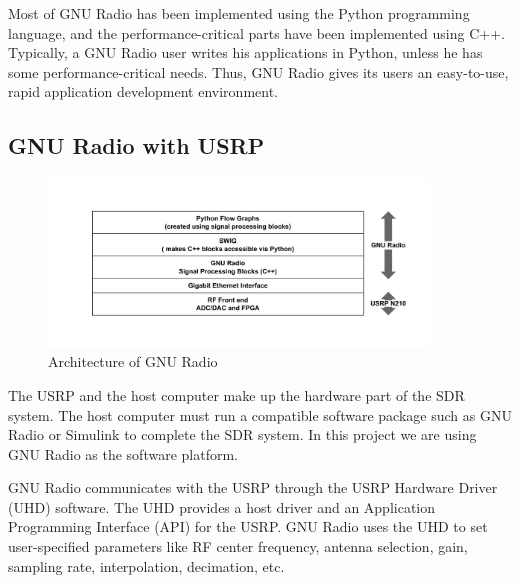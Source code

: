 Most of GNU Radio has been implemented using the Python programming language,
and the performance-critical parts have been implemented using C++. Typically,
a GNU Radio user writes his applications in Python, unless he has some
performance-critical needs. Thus, GNU Radio gives its users an easy-to-use,
rapid application development environment.

\subsection{GNU Radio with USRP}

\begin{figure}
\centering
\includegraphics[width=0.9\textwidth]{gnuradio_architecture}
\caption{Architecture of GNU Radio}
\label{gnuradio_architecture}
\end{figure}

The USRP and the host computer make up the hardware part of the SDR system. 
The host computer must run a compatible software package such as GNU Radio or
Simulink to complete the SDR system. In this project we are using GNU Radio
as the software platform.

GNU Radio communicates with the USRP through the USRP Hardware Driver (UHD)
software. The UHD provides a host driver and an Application Programming
Interface (API) for the USRP. GNU Radio uses the UHD to set user-specified
parameters like RF center frequency, antenna selection, gain, sampling rate,
interpolation, decimation, etc.

